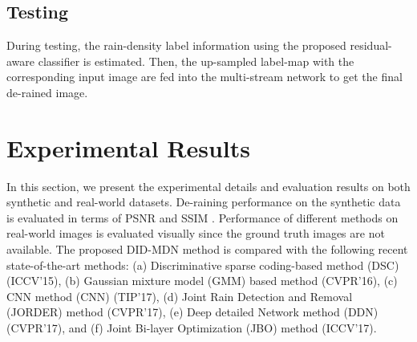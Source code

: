 \documentclass[10pt,twocolumn,letterpaper]{article}
\begin{document}
\begin{table*}[htp!]
	\centering
	\caption{Quantitative results evaluated in terms of average SSIM and PSNR (dB) (SSIM/PSNR).}
		\label{ta:quantitive}
\end{table*}
 





 
 
\subsection{Testing}
During testing, the rain-density label information using the proposed residual-aware classifier  is estimated. Then,  the up-sampled label-map with the corresponding input image are fed into the multi-stream network to get the final de-rained image.  



 

 
\section{Experimental Results}
\label{sec:exp}
In this section, we present the  experimental  details and  evaluation  results  on both synthetic and real-world datasets.   De-raining performance on the synthetic data is evaluated in terms of PSNR and SSIM \cite{ssim}.  Performance of different methods on real-world images is evaluated visually since the ground truth images are not available.   The proposed DID-MDN method is compared  with the following recent state-of-the-art methods: (a) Discriminative sparse coding-based method (DSC) \cite{dis_rain_2015} (ICCV'15), (b) Gaussian mixture model (GMM) based method \cite{rain_2016_gmm} (CVPR'16), (c) CNN method (CNN) \cite{derain_tip17}  (TIP'17), (d) Joint Rain Detection and Removal (JORDER) method \cite{derain_cvpr2017_multi} (CVPR'17), (e) Deep detailed Network method (DDN) \cite{derain_cvpr2017} (CVPR'17), and (f) Joint Bi-layer Optimization (JBO) method \cite{derain_iccv17} (ICCV'17).
\end{document}
